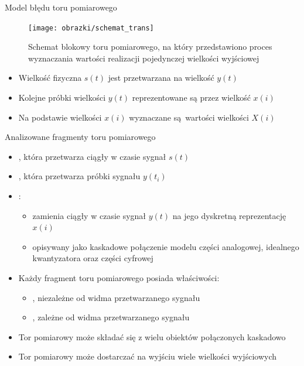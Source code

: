 \documentclass[12pt, polish, aspectratio = 169]{beamer}
\begin{document}
\begin{frame}{Model błędu toru pomiarowego}
\begin{figure}
\texttt{[image: obrazki/schemat\_trans]}
\caption{Schemat blokowy toru pomiarowego, na który przedstawiono proces wyznaczania wartości realizacji pojedynczej wielkości wyjściowej}
\end{figure}
\begin{itemize}
\item Wielkość fizyczna $s(t)$ jest przetwarzana na wielkość $y(t)$
\item Kolejne próbki wielkości $y(t)$ reprezentowane są przez wielkość $x(i)$
\item Na podstawie wielkości $x(i)$ wyznaczane są wartości wielkości $X(i)$
\end{itemize}
\end{frame}

\begin{frame}{Analizowane fragmenty toru pomiarowego}
\begin{itemize}
\item {}, która przetwarza ciągły w czasie sygnał $s(t)$
\item {}, która przetwarza próbki sygnału $y(t_{i})$
\item {}:
	\begin{itemize}
	\item zamienia ciągły w czasie sygnał $y(t)$ na jego dyskretną reprezentację $x(i)$
	\item opisywany jako kaskadowe połączenie modelu części analogowej, idealnego kwantyzatora oraz części cyfrowej
	\end{itemize}
\item Każdy fragment toru pomiarowego posiada właściwości:
	\begin{itemize}
	\item {}, niezależne od widma przetwarzanego sygnału
	\item {}, zależne od widma przetwarzanego sygnału
	\end{itemize}
\item Tor pomiarowy może składać się z wielu obiektów połączonych kaskadowo
\item Tor pomiarowy może dostarczać na wyjściu wiele wielkości wyjściowych
\end{itemize}
\end{frame}
\end{document}
